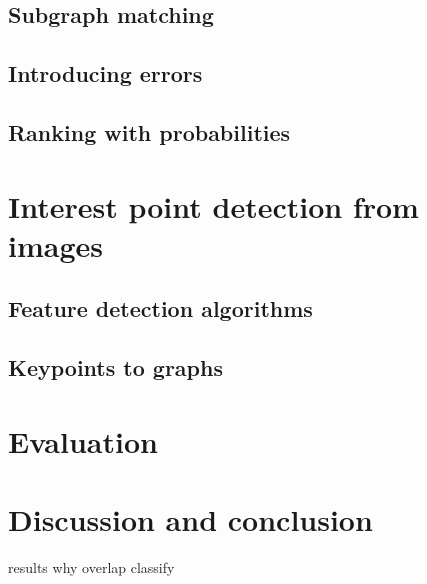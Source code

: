 \documentclass{article}
\begin{document}
\subsection{Subgraph matching}

\subsection{Introducing errors}

\subsection{Ranking with probabilities}



\section{Interest point detection from images}

\subsection{Feature detection algorithms}

\subsection{Keypoints to graphs}

\section{Evaluation}

\section{Discussion and conclusion}










results why overlap classify \cite{detection-overlap}





\printbibliography


\end{document}
